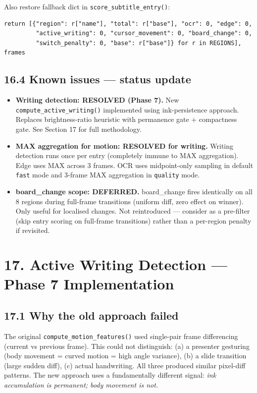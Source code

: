 \documentclass[11pt]{article}
\begin{document}
Also restore fallback dict in \texttt{score\_subtitle\_entry()}:

\begin{verbatim}
return [{"region": r["name"], "total": r["base"], "ocr": 0, "edge": 0,
         "active_writing": 0, "cursor_movement": 0, "board_change": 0,
         "switch_penalty": 0, "base": r["base"]} for r in REGIONS], frames
\end{verbatim}

\subsection*{16.4 Known issues --- status update}

\begin{itemize}[leftmargin=1.2em]
    \item \textbf{Writing detection: RESOLVED (Phase 7).} New \texttt{compute\_active\_writing()} implemented using ink-persistence approach. Replaces brightness-ratio heuristic with permanence gate + compactness gate. See Section 17 for full methodology.
    \item \textbf{MAX aggregation for motion: RESOLVED for writing.} Writing detection runs once per entry (completely immune to MAX aggregation). Edge uses MAX across 3 frames. OCR uses midpoint-only sampling in default \texttt{fast} mode and 3-frame MAX aggregation in \texttt{quality} mode.
    \item \textbf{board\_change scope: DEFERRED.} board\_change fires identically on all 8 regions during full-frame transitions (uniform diff, zero effect on winner). Only useful for localised changes. Not reintroduced --- consider as a pre-filter (skip entry scoring on full-frame transitions) rather than a per-region penalty if revisited.
\end{itemize}

\bigskip

\section*{17. Active Writing Detection --- Phase 7 Implementation}

\subsection*{17.1 Why the old approach failed}
The original \texttt{compute\_motion\_features()} used single-pair frame differencing (current vs previous frame). This could not distinguish: (a) a presenter gesturing (body movement = curved motion = high angle variance), (b) a slide transition (large sudden diff), (c) actual handwriting. All three produced similar pixel-diff patterns. The new approach uses a fundamentally different signal: \emph{ink accumulation is permanent; body movement is not.}
\end{document}
